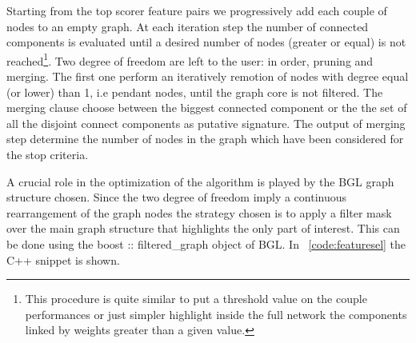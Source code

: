 \documentclass{standalone}
\begin{document}
Starting from the top scorer feature pairs we progressively add each couple of nodes to an empty graph.
At each iteration step the number of connected components is evaluated until a desired number of nodes (greater or equal) is not reached\footnote{
  This procedure is quite similar to put a threshold value on the couple performances or just simpler highlight inside the full network the components linked by weights greater than a given value.
}.
Two degree of freedom are left to the user: in order, \textsf{pruning} and \textsf{merging}.
The first one perform an iteratively remotion of nodes with degree equal (or lower) than 1, i.e pendant nodes, until the graph core is not filtered.
The \textsf{merging} clause choose between the biggest connected component or the the set of all the disjoint connect components as putative signature.
The output of \textsf{merging} step determine the number of nodes in the graph which have been considered for the stop criteria.

A crucial role in the optimization of the algorithm is played by the BGL graph structure chosen.
Since the two degree of freedom imply a continuous rearrangement of the graph nodes the strategy chosen is to apply a filter mask over the main graph structure that highlights the only part of interest.
This can be done using the \textsf{boost :: filtered\_graph} object of BGL.
In ~\ref{code:featuresel} the \textsf{C++} snippet is shown.
\end{document}
